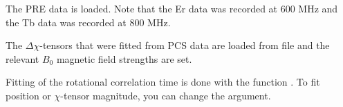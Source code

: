 \documentclass[a4paper,10pt,english]{sphinxmanual}
\begin{document}
The PRE data is loaded. Note that the Er data was recorded at 600 MHz and the Tb data was recorded at 800 MHz.

%
\begin{sphinxVerbatim}[commandchars=\\\{\}]
  
  
\end{sphinxVerbatim}

The \({\Delta\chi}\)-tensors that were fitted from PCS data are loaded from file and the relevant \({B_0}\) magnetic field strengths are set.

%
\begin{sphinxVerbatim}[commandchars=\\\{\}]
  
  
  
  
\end{sphinxVerbatim}

Fitting of the rotational correlation time is done with the function {\hyperref[\detokenize{reference/generated/paramagpy.fit.nlr_fit_metal_from_pre:paramagpy.fit.nlr_fit_metal_from_pre}]{}}. To fit position or \({\chi}\)-tensor magnitude, you can change the  argument.
\end{document}
